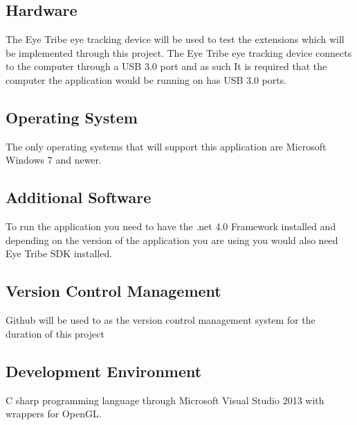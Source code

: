 \subsection{Hardware}
The Eye Tribe eye tracking device will be used to test the extensions which will be implemented through this project. The Eye Tribe eye tracking device  connects to the computer through a USB 3.0 port and as such It is required that the computer the application would be running on has USB 3.0 ports. 
\subsection{Operating System}
The only operating systems that will support this application are Microsoft Windows 7 and newer.
\subsection{Additional Software}
To run the application you need to have the .net 4.0 Framework installed and depending on the version of the application you are using you would also need Eye Tribe SDK installed.
\subsection{Version Control Management}
Github will be used to as the version control management system for the duration of this project
\subsection{Development Environment}
C sharp programming language through Microsoft Visual Studio 2013 with wrappers for OpenGL.
